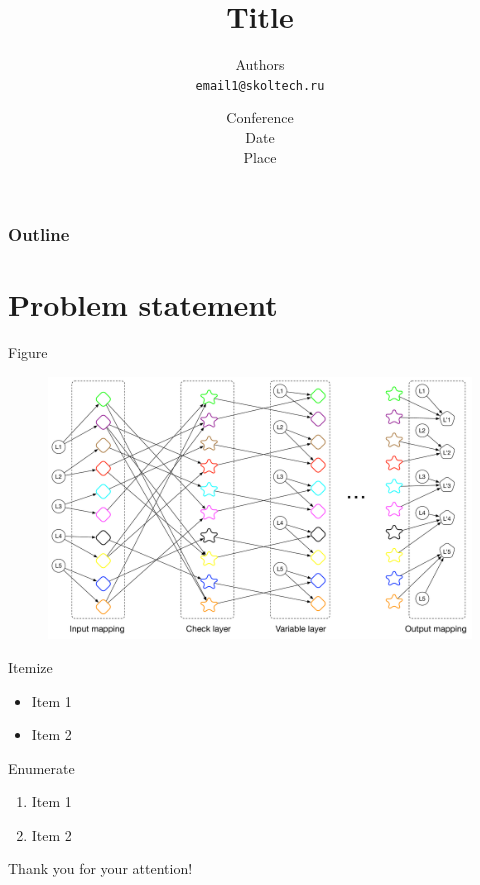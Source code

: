 \documentclass[xcolor=dvipsnames]{beamer}
\title[Short title]{Title}
\author[Short author]{
Authors\\
{\scriptsize \tt email1@skoltech.ru}}
\institute[Skoltech]{
\vfill
Center for Computational and Data-Intensive Science and Engineering (CDISE) \\
Skolkovo Institute of Science and Technology, Russia
}
\date{\vfill
{\scriptsize Conference}\\
\vskip 0.4cm
{\scriptsize Date\\Place}}
\begin{document}
\begin{frame}
  \titlepage
\end{frame}

\begin{frame}
  \frametitle{Outline}
  \tableofcontents
\end{frame}

\section{Problem statement}

\begin{frame}{Figure}
\begin{figure}
\centering
\includegraphics[width=0.7\linewidth]{NN_from_Tanner.pdf}
\end{figure}
\end{frame}

\begin{frame}{Itemize}
\begin{itemize}
    \item Item 1
    \item Item 2
\end{itemize}
\end{frame}

\begin{frame}{Enumerate}
\begin{enumerate}
    \item Item 1
    \item Item 2
\end{enumerate}
\end{frame}

\begin{frame}
\center
\Huge{Thank you for your attention!}
\end{frame}
\end{document}
